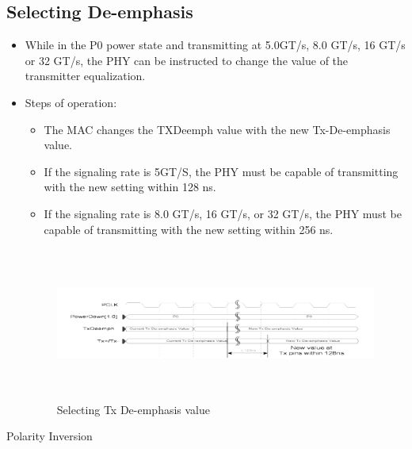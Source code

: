 \subsection{Selecting De-emphasis} 
\begin{itemize}
    \item While in the P0 power state and transmitting at 5.0GT/s, 8.0 GT/s, 16 GT/s or 32 GT/s, the PHY can be instructed to change the value of the transmitter equalization.
\item Steps of operation:
\begin{itemize}
    \item The MAC changes the TXDeemph value with the new Tx-De-emphasis value.

    \item If the signaling rate is 5GT/S, the PHY must be capable of transmitting with the new setting within 128 ns.
    \item If the signaling rate is 8.0 GT/s, 16 GT/s, or 32 GT/s, the PHY must be capable of transmitting with the new setting within 256 ns.

\end{itemize}
\begin{figure}[H]
  \centering
  \includegraphics[width=130mm,height=50mm]{images/clk_diagram/de.png}
  \caption{Selecting Tx De-emphasis value}
  \label{lane}
\end{figure}
\end{itemize}
\item Polarity Inversion
